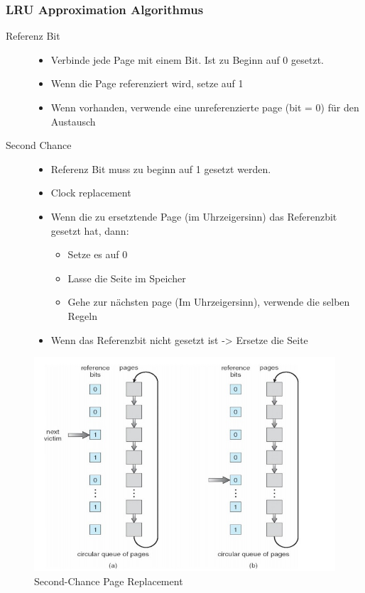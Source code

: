 \documentclass[a4paper]{scrreprt}
\begin{document}
\subsubsection{LRU Approximation Algorithmus}
\begin{description}
\item[Referenz Bit]
\begin{itemize}
\item Verbinde jede Page mit einem Bit. Ist zu Beginn auf 0 gesetzt.
\item Wenn die Page referenziert wird, setze auf 1
\item Wenn vorhanden, verwende eine unreferenzierte page (bit = 0) für den Austausch
\end{itemize}
\item[Second Chance]
\begin{itemize}
\item Referenz Bit muss zu beginn auf 1 gesetzt werden.
\item Clock replacement
\item Wenn die zu ersetztende Page (im Uhrzeigersinn) das Referenzbit gesetzt hat, dann:
\begin{itemize}
\item Setze es auf 0
\item Lasse die Seite im Speicher
\item Gehe zur nächsten page (Im Uhrzeigersinn), verwende die selben Regeln
\end{itemize}
\item Wenn das Referenzbit nicht gesetzt ist -> Ersetze die Seite
\end{itemize}
\end{description}

\begin{figure}[ht]
\centering
\includegraphics[scale=0.5]{graphics/secondchance.png}
\caption{Second-Chance Page Replacement}
\end{figure}
\end{document}

